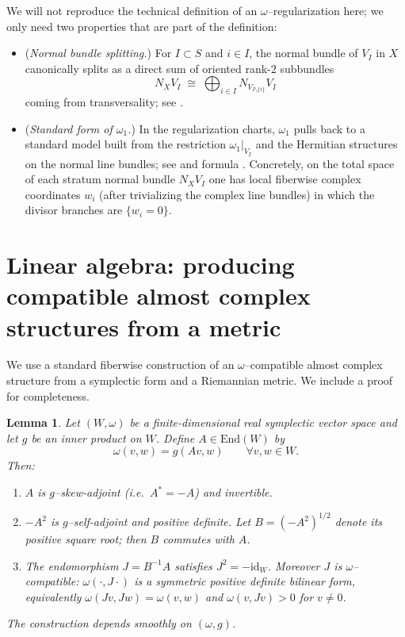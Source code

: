 \documentclass[11pt]{article}
\newtheorem{lemma}[theorem]{Lemma}
\theoremstyle{definition}
\begin{document}
We will not reproduce the technical definition of an $\omega$--regularization here; we only need two
properties that are part of the definition:
\begin{itemize}
\item (\emph{Normal bundle splitting.}) For $I\subset S$ and $i\in I$, the normal bundle of $V_I$ in $X$
canonically splits as a direct sum of oriented rank-$2$ subbundles
\[
N_XV_I \;\cong\; \bigoplus_{i\in I} N_{V_{I\setminus\{i\}}}V_I
\]
coming from transversality; see {\cite[\S2.2]{FTMZ}}.
\item (\emph{Standard form of $\omega_1$.}) In the regularization charts, $\omega_1$ pulls back to a
standard model built from the restriction $\omega_1|_{V_I}$ and the Hermitian structures on the normal
line bundles; see {\cite[Def.~2.9 and Def.~2.12]{FTMZ}} and formula {\cite[(2.9)--(2.11)]{FTMZ}}.
Concretely, on the total space of each stratum normal bundle $N_XV_I$ one has local fiberwise complex
coordinates $w_i$ (after trivializing the complex line bundles) in which the divisor branches are
$\{w_i=0\}$.
\end{itemize}

\section{Linear algebra: producing compatible almost complex structures from a metric}

We use a standard fiberwise construction of an $\omega$--compatible almost complex structure from
a symplectic form and a Riemannian metric. We include a proof for completeness.

\begin{lemma}\label{lem:polar}
Let $(W,\omega)$ be a finite-dimensional real symplectic vector space and let $g$ be an inner product on $W$.
Define $A\in \mathrm{End}(W)$ by
\begin{equation}\label{eq:defA}
\omega(v,w)= g(Av,w)\qquad\forall v,w\in W.
\end{equation}
Then:
\begin{enumerate}
\item $A$ is $g$--skew-adjoint (i.e.\ $A^\ast=-A$) and invertible.
\item $-A^2$ is $g$--self-adjoint and positive definite. Let $B=(-A^2)^{1/2}$ denote its positive square
root; then $B$ commutes with $A$.
\item The endomorphism $J=B^{-1}A$ satisfies $J^2=-\mathrm{id}_W$. Moreover $J$ is $\omega$--compatible:
$\omega(\cdot,J\cdot)$ is a symmetric positive definite bilinear form, equivalently $\omega(Jv,Jw)=\omega(v,w)$
and $\omega(v,Jv)>0$ for $v\neq 0$.
\end{enumerate}
The construction depends smoothly on $(\omega,g)$.
\end{lemma}
\end{document}

